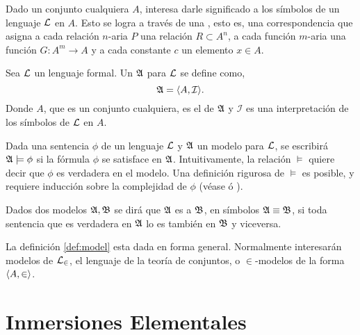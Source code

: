 Dado un conjunto cualquiera $A$, interesa darle significado a los símbolos de un
lenguaje $\mathcal { L }$ en $A$. Esto se logra a través de una , esto es,
una correspondencia que asigna a cada relación $n$-aria $P$ una relación
$R\subset A^n$, a cada función $m$-aria una función $G\colon A^m\to A$ y a cada
constante $c$ un elemento $x\in A$.

\begin{defi}\label{def:model}
    Sea $\mathcal { L }$ un lenguaje formal. Un  $\mathfrak { A }$ para $\mathcal { L }$ se define como,
    \[
        \mathfrak { A } = \langle A, \mathcal{I} \rangle.
    \]
    Donde $A$, que es un conjunto cualquiera, es el  de $\mathfrak { A }$ y
    $\mathcal{I}$ es una interpretación de los símbolos de $\mathcal { L }$ en $A$.
\end{defi}

Dada una sentencia $\phi$ de un lenguaje $\mathcal { L }$ y $\mathfrak { A }$ un modelo para $\mathcal { L }$,
se escribirá $\mathfrak { A }\models\phi$ si la fórmula $\phi$ se satisface en $\mathfrak { A }$.
Intuitivamente, la relación $\models$ quiere decir que $\phi$ es verdadera en el modelo.
Una definición rigurosa de $\models$ es posible, y requiere inducción sobre la complejidad
de $\phi$ (véase \autocite[\S 1.3]{chang_model_2012} ó \autocite[\S 12]{jech_set_2003}).

Dados dos modelos $\mathfrak { A }, \mathfrak { B }$ se dirá que $\mathfrak { A }$ es  a $\mathfrak { B }$, en símbolos $\mathfrak { A }\equiv \mathfrak { B }$, si toda sentencia
que es verdadera en $\mathfrak { A }$ lo es también en $\mathfrak { B }$ y viceversa.

La definición \ref{def:model} esta dada en forma general. Normalmente interesarán modelos de $\mathcal { L }_\in$,
el lenguaje de la teoría de conjuntos, o $\in$-modelos de la forma $\langle A,\in \rangle$.

\section{Inmersiones Elementales}
\label{sec:elem-embed}
